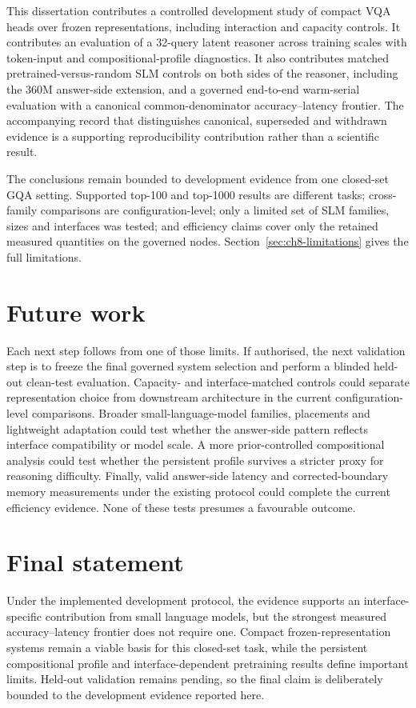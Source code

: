 This dissertation contributes a controlled development study of compact VQA
heads over frozen representations, including interaction and capacity
controls. It contributes an evaluation of a 32-query latent reasoner across
training scales with token-input and compositional-profile diagnostics. It
also contributes matched pretrained-versus-random SLM controls on both sides
of the reasoner, including the 360M answer-side extension, and a governed
end-to-end warm-serial evaluation with a canonical common-denominator
accuracy--latency frontier. The accompanying record that distinguishes
canonical, superseded and withdrawn evidence is a supporting reproducibility
contribution rather than a scientific result.

The conclusions remain bounded to development evidence from one closed-set GQA
setting. Supported top-100 and top-1000 results are different tasks;
cross-family comparisons are configuration-level; only a limited set of SLM
families, sizes and interfaces was tested; and efficiency claims cover only
the retained measured quantities on the governed nodes. Section~\ref{sec:ch8-limitations}
gives the full limitations.

\section{Future work}
\label{sec:ch9-future}

Each next step follows from one of those limits. If authorised, the next
validation step is to freeze the final governed system selection and perform a
blinded held-out clean-test evaluation. Capacity- and interface-matched
controls could separate representation choice from downstream architecture in
the current configuration-level comparisons. Broader small-language-model
families, placements and lightweight adaptation could test whether the
answer-side pattern reflects interface compatibility or model scale. A more
prior-controlled compositional analysis could test whether the persistent
profile survives a stricter proxy for reasoning difficulty. Finally, valid
answer-side latency and corrected-boundary memory measurements under the
existing protocol could complete the current efficiency evidence. None of
these tests presumes a favourable outcome.

\section{Final statement}
\label{sec:ch9-final}

Under the implemented development protocol, the evidence supports an
interface-specific contribution from small language models, but the strongest
measured accuracy--latency frontier does not require one. Compact
frozen-representation systems remain a viable basis for this closed-set task,
while the persistent compositional profile and interface-dependent pretraining
results define important limits. Held-out validation remains pending, so the
final claim is deliberately bounded to the development evidence reported here.
